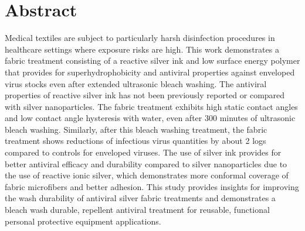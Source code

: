 \documentclass[10pt,letterpaper]{article}
\begin{document}
\begin{flushleft}
 \setlength {\marginparwidth }{2cm}


\end{flushleft}

\section*{Abstract}
Medical textiles are subject to particularly harsh disinfection procedures 
in healthcare settings where exposure risks are high.  
This work demonstrates a fabric treatment consisting of 
a reactive silver ink and low surface energy polymer that 
provides for 
superhydrophobicity and antiviral properties against enveloped virus stocks 
even after extended ultrasonic bleach washing. The antiviral properties of reactive silver ink has not been previously reported or compared with silver nanoparticles.
The fabric treatment 
exhibits high static contact angles and low contact angle hysteresis with water, even after 300 minutes of ultrasonic bleach washing. Similarly, after this bleach washing treatment, the fabric treatment shows reductions of infectious virus quantities by about 2 logs compared to controls for enveloped viruses. The use of silver ink provides for 
better antiviral efficacy and durability compared to silver nanoparticles due to the use of reactive ionic silver, which demonstrates more conformal coverage of fabric microfibers and better %
adhesion.  This study provides insights for improving the wash durability of antiviral silver fabric treatments and demonstrates a bleach wash durable, repellent antiviral treatment for reusable, functional personal protective equipment applications. 
\end{document}
